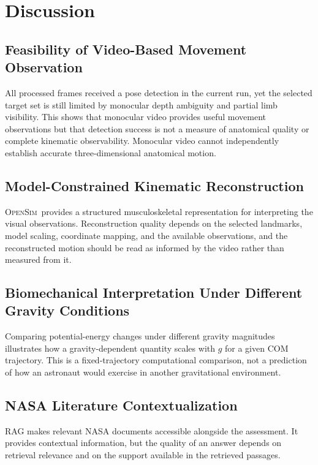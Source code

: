 \documentclass[11pt,a4paper]{article}
\newcommand{\OpenSim}{\textsc{OpenSim}}
\begin{document}
\section{Discussion}

\subsection{Feasibility of Video-Based Movement Observation}

All processed frames received a pose detection in the current run, yet the selected target set is still limited by monocular depth ambiguity and partial limb visibility. This shows that monocular video provides useful movement observations but that detection success is not a measure of anatomical quality or complete kinematic observability. Monocular video cannot independently establish accurate three-dimensional anatomical motion.

\subsection{Model-Constrained Kinematic Reconstruction}

\OpenSim\ provides a structured musculoskeletal representation for interpreting the visual observations. Reconstruction quality depends on the selected landmarks, model scaling, coordinate mapping, and the available observations, and the reconstructed motion should be read as informed by the video rather than measured from it.

\subsection{Biomechanical Interpretation Under Different Gravity Conditions}

Comparing potential-energy changes under different gravity magnitudes illustrates how a gravity-dependent quantity scales with $g$ for a given COM trajectory. This is a fixed-trajectory computational comparison, not a prediction of how an astronaut would exercise in another gravitational environment.

\subsection{NASA Literature Contextualization}

RAG makes relevant NASA documents accessible alongside the assessment. It provides contextual information, but the quality of an answer depends on retrieval relevance and on the support available in the retrieved passages.
\end{document}
